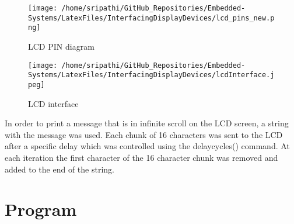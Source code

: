 \documentclass[12pt, letterpaper]{article}
\begin{document}
\begin{figure}[!h]
	\centering
	\texttt{[image: /home/sripathi/GitHub\_Repositories/Embedded-Systems/LatexFiles/InterfacingDisplayDevices/lcd\_pins\_new.png]}
	\caption{LCD PIN diagram}
	\label{fig:lcdPinout}
\end{figure} 

\begin{figure}[!h]
	\centering
	\texttt{[image: /home/sripathi/GitHub\_Repositories/Embedded-Systems/LatexFiles/InterfacingDisplayDevices/lcdInterface.jpeg]}
	\caption{LCD interface}
	\label{fig:lcdInterface}
\end{figure} 

In order to print a message that is in infinite scroll on the LCD screen, a string with the message was used. Each chunk of 16 characters was sent to the LCD after a specific delay which was controlled using the delaycycles() command. At each iteration the first character of the 16 character chunk was removed and added to the end of the string.
\newpage
\section{Program}
\end{document}
